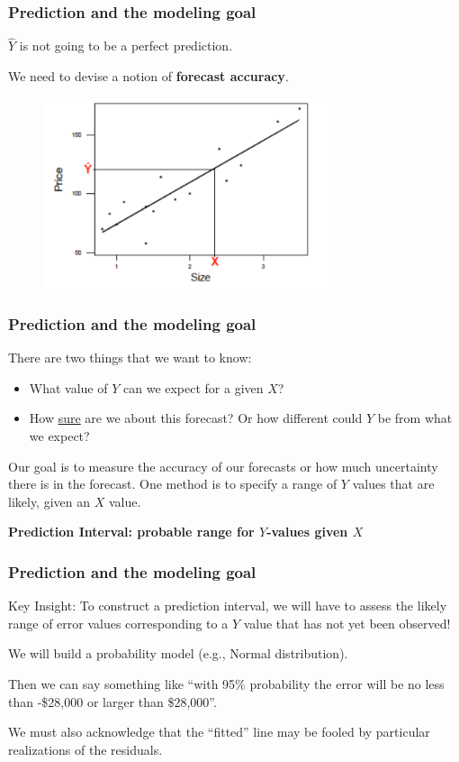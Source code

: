 \documentclass{beamer}
\newcommand{\bl}{\color{lightblue}}
\newcommand{\rd}{\color{burntorange}}
\newcommand{\bk}{\color{black}}
\newcommand{\bi}{\begin{itemize}}
\newcommand{\ib}{\end{itemize}}
\newcommand{\p}{\item}
\newcommand{\sk}{\vspace{.5cm}}
\begin{document}
\begin{frame}
\frametitle{Prediction and the modeling goal}

$\hat{Y}$ is not going to be a perfect prediction.

\sk
We need to devise a notion of {\bf\bl forecast accuracy\bl}.

\sk ~~~~~
\includegraphics[width=3.3in]{figures/xypred}

\end{frame}

\begin{frame}
\frametitle{Prediction and the modeling goal}

There are two things that we want to know:\vspace{2mm}
\bi
\p What value of $Y$ can we expect for a given $X$?
\p How \underline{sure} are we about this forecast? Or how different could $Y$ be
from what we expect?
\ib

\sk
Our goal is to measure the accuracy of our forecasts or \bl how much
uncertainty there is in the forecast\bk. One method is to specify a range
of $Y$ values that are likely, given an $X$ value.

\sk
\begin{center}\rd
{\bf Prediction Interval: probable range for $Y$-values given $X$}
\end{center}

\end{frame}


\begin{frame}
\frametitle{Prediction and the modeling goal}

\bl Key Insight: \bk To construct a prediction interval, 
we will have to assess the likely range of error values
corresponding to a $Y$ value that has not yet been observed!

\sk
We will build a \bl probability model \bk (e.g.,  Normal
distribution).

\sk
Then we can say something like \rd``with 95\% probability the
error will be no less than -\$28,000 or larger than \$28,000''\bk.

\sk
 We must also acknowledge that the ``fitted'' line may be fooled by
particular realizations of the residuals.
\end{frame}
\end{document}

